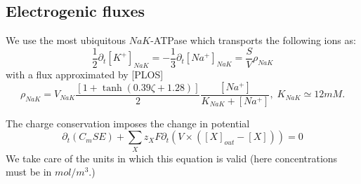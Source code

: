 \documentclass{revtex4}
\begin{document}
\subsection{Electrogenic fluxes}
We use the most ubiquitous $NaK$-ATPase which transports the following ions as:
\begin{equation}
	\dfrac{1}{2} \partial_t \left[K^+\right]_{{NaK}} = -\dfrac{1}{3} \partial_t \left[ Na^+\right]_{{NaK}}
	= \dfrac{S}{V}\rho_{NaK}
\end{equation}
with a flux approximated by [PLOS]
\begin{equation}
	\rho_{NaK} = V_{NaK} \dfrac{\left[1+\tanh\left(0.39\zeta+1.28\right)\right]}{2}\dfrac{\left[Na^+\right]}{K_{NaK}+\left[Na^+\right]},\;K_{NaK}\simeq12mM.
\end{equation}

The charge conservation imposes the change in potential
\begin{equation}
	\partial_t\left( C_m S  E\right) + \sum_X z_X F \partial_t\left( V \times  (\left[X\right]_{out}-\left[X\right]) \right) = 0
\end{equation}
We take care of the units in which this equation is valid (here concentrations must be in $mol/m^3$.)
\end{document}
